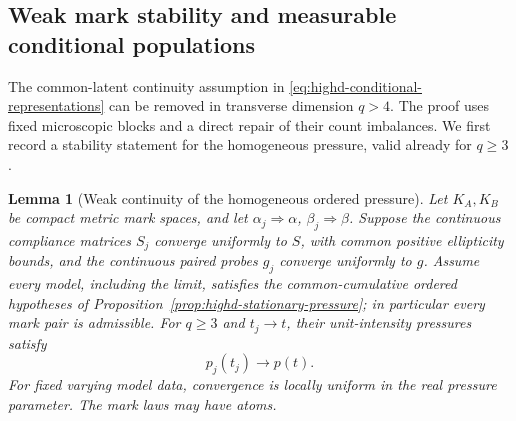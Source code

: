 \documentclass[11pt,reqno]{amsart}
\newtheorem{lemma}[theorem]{Lemma}
\theoremstyle{definition}
\theoremstyle{remark}
\numberwithin{equation}{section}
\begin{document}
\subsection{Weak mark stability and measurable conditional populations}
\label{subsec:highd-measurable-pressure}

The common-latent continuity assumption in
\eqref{eq:highd-conditional-representations} can be removed in transverse
dimension \(q>4\). The proof uses fixed microscopic blocks and a direct
repair of their count imbalances. We first record a stability statement
for the homogeneous pressure, valid already for \(q\ge3\).

\begin{lemma}[Weak continuity of the homogeneous ordered pressure]
\label{lem:highd-weak-mark-pressure}
Let \(K_A,K_B\) be compact metric mark spaces, and let
\(\alpha_j\Rightarrow\alpha\), \(\beta_j\Rightarrow\beta\).
Suppose the continuous compliance matrices \(S_j\) converge uniformly
to \(S\), with common positive ellipticity bounds, and the continuous
paired probes \(g_j\) converge uniformly to \(g\).
Assume every model, including the limit, satisfies the common-cumulative
ordered hypotheses of Proposition~\ref{prop:highd-stationary-pressure};
in particular every mark pair is admissible. For \(q\ge3\) and
\(t_j\to t\), their unit-intensity pressures satisfy
\[
                    p_j(t_j)\longrightarrow p(t).
\]
For fixed varying model data, convergence is locally uniform in the
real pressure parameter. The mark laws may have atoms.
\end{lemma}
\end{document}
